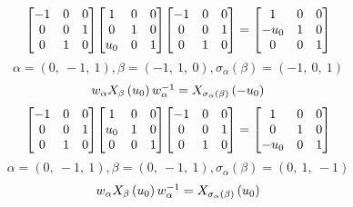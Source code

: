 \documentclass[11pt]{article}
\theoremstyle{definition}
\begin{document}
\[
\scaletoalign{\textwidth}{{\left[\begin{matrix}-1 & 0 & 0\\0 & 0 & 1\\0 & 1 & 0\end{matrix}\right]} {\left[\begin{matrix}1 & 0 & 0\\0 & 1 & 0\\u_{0} & 0 & 1\end{matrix}\right]} {\left[\begin{matrix}-1 & 0 & 0\\0 & 0 & 1\\0 & 1 & 0\end{matrix}\right]} = {\left[\begin{matrix}1 & 0 & 0\\- u_{0} & 1 & 0\\0 & 0 & 1\end{matrix}\right]}}
\]
\[
\alpha = \left( 0, \  -1, \  1\right), \beta = \left( -1, \  1, \  0\right), \sigma_{\alpha}(\beta) = \left( -1, \  0, \  1\right)
\]
\[
\scaletoalign{\textwidth}{w_{\alpha} X_{\beta}\left(u_{0}\right) w_{\alpha}^{-1} = X_{\sigma_{\alpha}\left(\beta\right)}\left(- u_{0}\right)}
\]
\[
\scaletoalign{\textwidth}{{\left[\begin{matrix}-1 & 0 & 0\\0 & 0 & 1\\0 & 1 & 0\end{matrix}\right]} {\left[\begin{matrix}1 & 0 & 0\\u_{0} & 1 & 0\\0 & 0 & 1\end{matrix}\right]} {\left[\begin{matrix}-1 & 0 & 0\\0 & 0 & 1\\0 & 1 & 0\end{matrix}\right]} = {\left[\begin{matrix}1 & 0 & 0\\0 & 1 & 0\\- u_{0} & 0 & 1\end{matrix}\right]}}
\]
\[
\alpha = \left( 0, \  -1, \  1\right), \beta = \left( 0, \  -1, \  1\right), \sigma_{\alpha}(\beta) = \left( 0, \  1, \  -1\right)
\]
\[
\scaletoalign{\textwidth}{w_{\alpha} X_{\beta}\left(u_{0}\right) w_{\alpha}^{-1} = X_{\sigma_{\alpha}\left(\beta\right)}\left(u_{0}\right)}
\]
\end{document}
